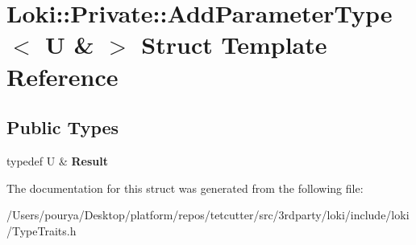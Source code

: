 \hypertarget{structLoki_1_1Private_1_1AddParameterType_3_01U_01_6_01_4}{}\section{Loki\+:\+:Private\+:\+:Add\+Parameter\+Type$<$ U \& $>$ Struct Template Reference}
\label{structLoki_1_1Private_1_1AddParameterType_3_01U_01_6_01_4}
\subsection*{Public Types}
\begin{DoxyCompactItemize}
\item 
\hypertarget{structLoki_1_1Private_1_1AddParameterType_3_01U_01_6_01_4_ab0decdcced757ff4c8405faa31538c2f}{}typedef U \& {\bfseries Result}\label{structLoki_1_1Private_1_1AddParameterType_3_01U_01_6_01_4_ab0decdcced757ff4c8405faa31538c2f}

\end{DoxyCompactItemize}


The documentation for this struct was generated from the following file\+:\begin{DoxyCompactItemize}
\item 
/\+Users/pourya/\+Desktop/platform/repos/tetcutter/src/3rdparty/loki/include/loki/Type\+Traits.\+h\end{DoxyCompactItemize}
